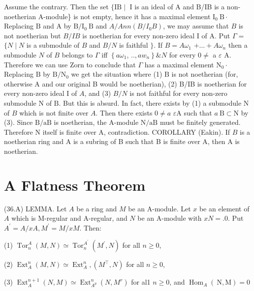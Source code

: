 Assume the contrary. Then the set $\{\mathrm{IB} \mid$ I is an ideal of A and B/IB is a non-noetherian A-module\} is not empty, hence it has a maximal element $\mathrm{I}_{0} \mathrm{~B} \cdot$ Replacing $\mathrm{B}$ and $\mathrm{A}$ by $\mathrm{B} / \mathrm{I}_{0} \mathrm{~B}$ and $A / A n n\left(B / I_{0} B\right)$, we may assume that $B$ is not noetherian but $B / I B$ is noetherian for every non-zero ideal I of A. Put $\Gamma=$ $\{N \mid N$ is a submodule of $B$ and $B / N$ is faithful $\}$. If $B=A \omega_{1}$ $+\ldots+A \omega_{n}$ then a submodule $N$ of $B$ belongs to $\Gamma$ iff $\left\{a \omega_{1}\right.$, $\left.. ., a w_{n}\right\} \& N$ for every $0 \neq$ a $\varepsilon$ A. Therefore we can use Zorn to conclude that $\Gamma$ has a maximal element $\mathrm{N}_{0} \cdot$ Replacing $\mathrm{B}$ by $\mathrm{B} / \mathrm{N}_{0}$ we get the situation where (1) $\mathrm{B}$ is not noetherian (for, otherwise A and our original B would be noetherian), (2) B/IB is noetherian for every non-zero ideal I of $A$, and (3) $B / N$ is not faithful for every non-zero submodule $\mathrm{N}$ of $\mathrm{B} .$ But this is absurd. In fact, there exists by (1) a submodule $\mathrm{N}$ of $B$ which is not finite over $A$. Then there exists $0 \neq a$ $\varepsilon \mathrm{A}$ such that $a \mathrm{~B} \subset \mathrm{N}$ by (3). Since $\mathrm{B} / \mathrm{aB}$ is noetherian, the A-module $\mathrm{N} / \mathrm{aB}$ must be finitely generated. Therefore $\mathrm{N}$ itself is finite over A, contradiction. COROLLARY (Eakin). If $B$ is a noetherian ring and A is a subring of B such that B is finite over A, then A is noetherian.

\section{A Flatness Theorem}
(36.A) LEMMA. Let $A$ be a ring and $M$ be an A-module. Let $x$ be an element of $A$ which is M-regular and A-regular, and $N$ be an A-module with $x N=.0$. Put $A^{\prime}=A / x A, M^{\prime}=M / x M$. Then:

(1) $\operatorname{Tor}_{n}^{A}(M, N) \simeq \operatorname{Tor}_{n}^{A^{\prime}}\left(M^{\prime}, N\right)$ for all $n \geqslant 0$,

(2) $\operatorname{Ext}_{A}^{n}(M, N) \simeq \operatorname{Ext}_{A}^{n},\left(M^{\top}, N\right)$ for all $n \geqslant 0$,

(3) $\operatorname{Ext}_{A}^{n+1}(N, M) \simeq \operatorname{Ext}_{A^{p}}^{n}\left(N, M^{r}\right)$ for al1 $n \geqslant 0$, and $\operatorname{Hom}_{A}(\mathrm{~N}, \mathrm{M})=0$

